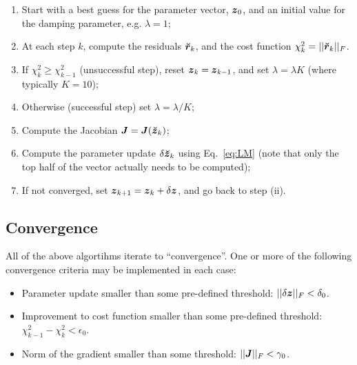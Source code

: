\documentclass[useAMS,usenatbib]{mn2e}
\newcommand{\zz}{\bmath{z}}
\newcommand{\mat}[1]{{\bmath{#1}}}
\newcommand{\JJ}{\mat{J}} %
\newcommand{\AUG}[1]{\bmath{\breve{#1}}}
\newcommand{\Zz}{\AUG{z}}
\newcommand{\Rr}{\AUG{r}}
\begin{document}
\begin{enumerate}
\item Start with a best guess for the parameter vector, $\bmath{z}_0$, and an initial value
for the damping parameter, e.g. $\lambda=1$;
\item At each step $k$, compute the residuals $\Rr_k$, and the cost function $\chi^2_k=||\Rr_k||_F$.
\item If $\chi^2_k\ge\chi^2_{k-1}$ (unsuccessful step), reset $\zz_k=\zz_{k-1}$, and set $\lambda=\lambda K$ (where typically $K=10$);
\item Otherwise (successful step) set $\lambda=\lambda/K$;
\item Compute the Jacobian $\JJ=\JJ(\Zz_k)$;
\item Compute the parameter update $\delta\Zz_k$ using Eq.~\ref{eq:LM} (note that only the top half of the vector actually needs to be computed);
\item If not converged, set $\bmath{z}_{k+1}=\bmath{z}_k+\delta\zz$, and go back to step (ii).
\end{enumerate}

\subsection{Convergence}

All of the above algortihms iterate to ``convergence''. One or more of the following convergence criteria may be implemented in each case:

\begin{itemize}
\item Parameter update smaller than some pre-defined threshold: $||\delta \bmath{z}||_F<\delta_0$.
\item Improvement to cost function smaller than some pre-defined threshold: $\chi^2_{k-1}-\chi^2_{k}<\epsilon_0$.
\item Norm of the gradient smaller than some threshold:  $||\JJ||_F<\gamma_0$.
\end{itemize}



\label{lastpage}
\end{document}

